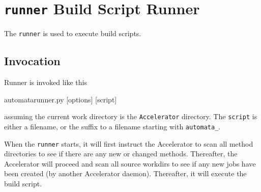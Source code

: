 \clearpage
\section{\texttt{runner} Build Script Runner}
\label{sec:exec_runner}

The \texttt{runner} is used to execute build scripts.

\subsection{Invocation}
Runner is invoked like this
\begin{shell}
automatarunner.py [options] [script]
\end{shell}
assuming the current work directory is the \texttt{Accelerator}
directory.  The \texttt{script} is either a filename, or the suffix to
a filename starting with \texttt{automata\_}.


When the \texttt{runner} starts, it will first instruct the
Accelerator to scan all method directories to see if there are any new
or changed methods.  Thereafter, the Accelerator will proceed and scan
all source workdirs to see if any new jobs have been created (by
another Accelerator daemon).  Thereafter, it will execute the build
script.


